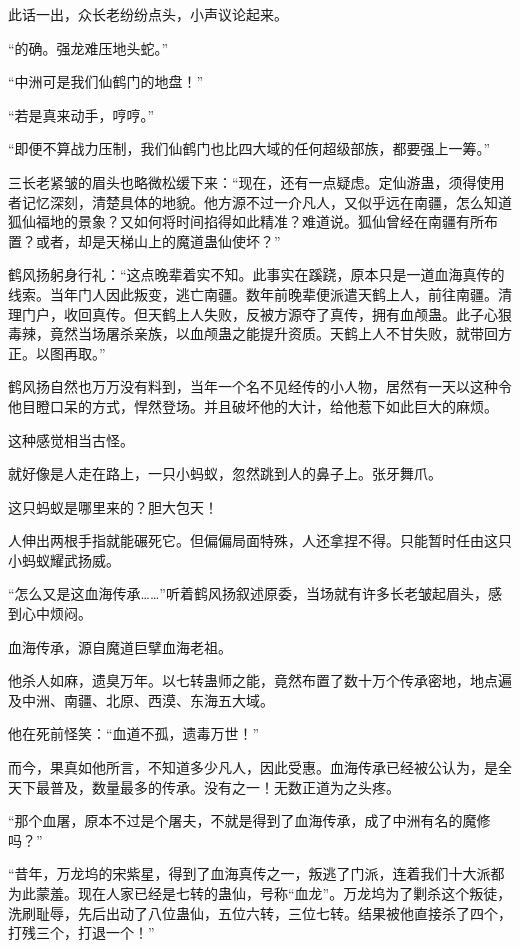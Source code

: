 \begin{this_body}
此话一出，众长老纷纷点头，小声议论起来。

“的确。强龙难压地头蛇。”

“中洲可是我们仙鹤门的地盘！”

“若是真来动手，哼哼。”

“即便不算战力压制，我们仙鹤门也比四大域的任何超级部族，都要强上一筹。”

三长老紧皱的眉头也略微松缓下来：“现在，还有一点疑虑。定仙游蛊，须得使用者记忆深刻，清楚具体的地貌。他方源不过一介凡人，又似乎远在南疆，怎么知道狐仙福地的景象？又如何将时间掐得如此精准？难道说。狐仙曾经在南疆有所布置？或者，却是天梯山上的魔道蛊仙使坏？”

鹤风扬躬身行礼：“这点晚辈着实不知。此事实在蹊跷，原本只是一道血海真传的线索。当年门人因此叛变，逃亡南疆。数年前晚辈便派遣天鹤上人，前往南疆。清理门户，收回真传。但天鹤上人失败，反被方源夺了真传，拥有血颅蛊。此子心狠毒辣，竟然当场屠杀亲族，以血颅蛊之能提升资质。天鹤上人不甘失败，就带回方正。以图再取。”

鹤风扬自然也万万没有料到，当年一个名不见经传的小人物，居然有一天以这种令他目瞪口呆的方式，悍然登场。并且破坏他的大计，给他惹下如此巨大的麻烦。

这种感觉相当古怪。

就好像是人走在路上，一只小蚂蚁，忽然跳到人的鼻子上。张牙舞爪。

这只蚂蚁是哪里来的？胆大包天！

人伸出两根手指就能碾死它。但偏偏局面特殊，人还拿捏不得。只能暂时任由这只小蚂蚁耀武扬威。

“怎么又是这血海传承……”听着鹤风扬叙述原委，当场就有许多长老皱起眉头，感到心中烦闷。

血海传承，源自魔道巨擘血海老祖。

他杀人如麻，遗臭万年。以七转蛊师之能，竟然布置了数十万个传承密地，地点遍及中洲、南疆、北原、西漠、东海五大域。

他在死前怪笑：“血道不孤，遗毒万世！”

而今，果真如他所言，不知道多少凡人，因此受惠。血海传承已经被公认为，是全天下最普及，数量最多的传承。没有之一！无数正道为之头疼。

“那个血屠，原本不过是个屠夫，不就是得到了血海传承，成了中洲有名的魔修吗？”

“昔年，万龙坞的宋紫星，得到了血海真传之一，叛逃了门派，连着我们十大派都为此蒙羞。现在人家已经是七转的蛊仙，号称“血龙”。万龙坞为了剿杀这个叛徒，洗刷耻辱，先后出动了八位蛊仙，五位六转，三位七转。结果被他直接杀了四个，打残三个，打退一个！”


\end{this_body}
